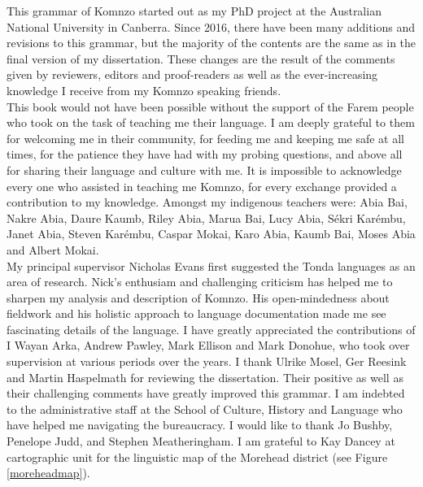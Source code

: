

This grammar of Komnzo started out as my PhD project at the Australian National University in Canberra. Since 2016, there have been many additions and revisions to this grammar, but the majority of the contents are the same as in the final version of my dissertation. These changes are the result of the comments given by reviewers, editors and proof-readers as well as the ever-increasing knowledge I receive from my Komnzo speaking friends.\\

This book would not have been possible without the support of the Farem people who took on the task of teaching me their language. I am deeply grateful to them for welcoming me in their community, for feeding me and keeping me safe at all times, for the patience they have had with my probing questions, and above all for sharing their language and culture with me. It is impossible to acknowledge every one who assisted in teaching me Komnzo, for every exchange provided a contribution to my knowledge. Amongst my indigenous teachers were: Abia Bai, Nakre Abia, Daure Kaumb, Riley Abia, \textsuperscript{\dag}Marua Bai, Lucy Abia, Sékri Karémbu, Janet Abia, Steven Karémbu, Caspar Mokai, Karo Abia, Kaumb Bai, Moses Abia and Albert Mokai.\\

My principal supervisor Nicholas Evans first suggested the Tonda languages as an area of research. Nick's enthusiam and challenging criticism has helped me to sharpen my analysis and description of Komnzo. His open-mindedness about fieldwork and his holistic approach to language documentation made me see fascinating details of the language. I have greatly appreciated the contributions of I Wayan Arka, Andrew Pawley, Mark Ellison and Mark Donohue, who took over supervision at various periods over the years. I thank Ulrike Mosel, Ger Reesink and Martin Haspelmath for reviewing the dissertation. Their positive as well as their challenging comments have greatly improved this grammar. I am indebted to the administrative staff at the School of Culture, History and Language who have helped me navigating the bureaucracy. I would like to thank Jo Bushby, Penelope Judd, and Stephen Meatheringham. I am grateful to Kay Dancey at cartographic unit for the linguistic map of the Morehead district (see Figure \ref{moreheadmap}).\\

